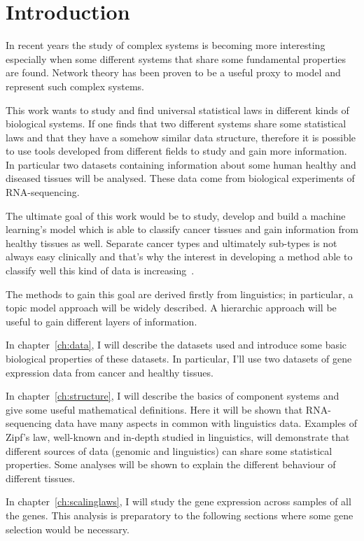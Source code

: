 \chapter*{Introduction}\label{ch:intro}
In recent years the study of complex systems is becoming more interesting especially when some different systems that share  some fundamental properties are found. Network theory has been proven to be a useful proxy to model and represent such complex systems.

This work wants to study and find universal statistical laws in different kinds of biological systems. If one finds that two different systems share some statistical laws and that they have a somehow similar data structure, therefore it is possible to use tools developed from different fields to study and gain more information. In particular two datasets containing information about some human healthy and diseased tissues will be analysed. These data come from biological experiments of RNA-sequencing.

The ultimate goal of this work would be to study, develop and build a machine learning's model which is able to classify cancer tissues and gain information from healthy tissues as well. Separate cancer types and ultimately sub-types is not always easy clinically and that's why the interest in developing a method able to classify well this kind of data is increasing~\cite{Farver2018}.

The methods to gain this goal are derived firstly from linguistics; in particular, a topic model approach will be widely described. A hierarchic approach will be useful to gain different layers of information.

In chapter~\ref{ch:data}, I will describe the datasets used and introduce some basic biological properties of these datasets. In particular, I'll use two datasets of gene expression data from cancer and healthy tissues.

In chapter~\ref{ch:structure}, I will describe the basics of component systems and give some useful mathematical definitions. Here it will be shown that RNA-sequencing data have many aspects in common with linguistics data. Examples of Zipf's law, well-known and in-depth studied in linguistics, will demonstrate that different sources of data (genomic and linguistics) can share some statistical properties. Some analyses will be shown to explain the different behaviour of different tissues.

In chapter~\ref{ch:scalinglaws}, I will study the gene expression across samples of all the genes. This analysis is preparatory to the following sections where some gene selection would be necessary.

